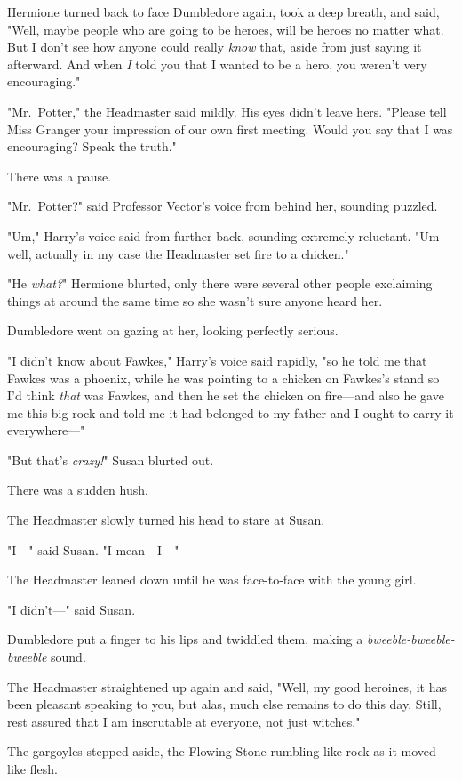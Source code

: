 Hermione turned back to face Dumbledore again, took a deep breath, and said,
"Well, maybe people who are going to be heroes, will be heroes no matter what.
But I don't see how anyone could really \emph{know} that, aside from just
saying it afterward. And when \emph{I} told you that I wanted to be a hero, you
weren't very encouraging."

"Mr.~Potter," the Headmaster said mildly. His eyes didn't leave hers. "Please
tell Miss Granger your impression of our own first meeting. Would you say that
I was encouraging? Speak the truth."

There was a pause.

"Mr.~Potter?" said Professor Vector's voice from behind her, sounding puzzled.

"Um," Harry's voice said from further back, sounding extremely reluctant.
"Um{\el} well, actually in my case the Headmaster set fire to a chicken."

"He \emph{what?}" Hermione blurted, only there were several other people
exclaiming things at around the same time so she wasn't sure anyone heard her.

Dumbledore went on gazing at her, looking perfectly serious.

"I didn't know about Fawkes," Harry's voice said rapidly, "so he told me that
Fawkes was a phoenix, while he was pointing to a chicken on Fawkes's stand so
I'd think \emph{that} was Fawkes, and then he set the chicken on fire---and
also he gave me this big rock and told me it had belonged to my father and I
ought to carry it everywhere---"

"But that's \emph{crazy!}" Susan blurted out.

There was a sudden hush.

The Headmaster slowly turned his head to stare at Susan.

"I---" said Susan. "I mean---I---"

The Headmaster leaned down until he was face-to-face with the young girl.

"I didn't---" said Susan.

Dumbledore put a finger to his lips and twiddled them, making a
\emph{bweeble-bweeble-bweeble} sound.

The Headmaster straightened up again and said, "Well, my good heroines, it has
been pleasant speaking to you, but alas, much else remains to do this day.
Still, rest assured that I am inscrutable at everyone, not just witches."

The gargoyles stepped aside, the Flowing Stone rumbling like rock as it moved
like flesh.


